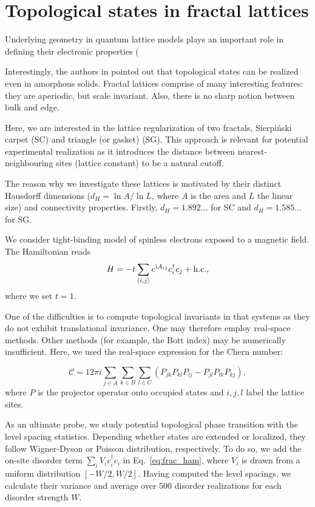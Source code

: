 \chapter{Topological states in fractal lattices}
\label{ch:fractals}

Underlying geometry in quantum lattice models plays an important role in defining their electronic properties (

Interestingly, the authors in pointed out that topological states can be realized even in amorphous solids. Fractal lattices comprise of many interesting features: they are aperiodic, but scale invariant. Also, there is no sharp notion between bulk and edge.

Here, we are interested in the lattice regularization of two fractals, Sierpiński carpet (SC) and triangle (or gasket) (SG). This approach is relevant for potential experimental realization as it introduces the distance between nearest-neighbouring sites (lattice constant) to be a natural cutoff.

The reason why we investigate these lattices is motivated by their distinct Hausdorff dimensions ($d_H = \ln A / \ln L$, where $A$ is the area and $L$ the linear size) and connectivity properties. Firstly, $d_H = 1.892 \ldots$ for SC and $d_H = 1.585 \ldots$ for SG. 



We consider tight-binding model of spinless electrons exposed to a magnetic field. The Hamiltonian reads
\begin{equation}
H = -t  \sum_{\langle i, j \rangle} e^{\textnormal{i} A_{ij}} c^{\dagger}_i c_j + \mathrm{h.c.},
\label{eq:frac_ham}
\end{equation}
where we set $t = 1$.

One of the difficulties is to compute topological invariants in that systems as they do not exhibit translational invariance. One may therefore employ real-space methods. Other methods (for example, the Bott index) may be numerically insufficient. Here, we used the real-space expression for the Chern number:

\begin{equation}
\mathcal{C} = 12 \pi i \sum_{j \in A} \sum_{k \in B} \sum_{l \in C} \left( P_{jk} P_{kl} P_{lj} - P_{jl} P_{lk} P_{kj} \right),
\label{eq: chern_real}
\end{equation}
where $P$ is the projector operator onto occupied states and $i, j, l$ label the lattice sites.



As an ultimate probe, we study potential topological phase transition with the level spacing statistics. Depending whether states are extended or localized, they follow Wigner-Dyson or Poisson distribution, respectively. To do so, we add the on-site disorder term $\sum_i V_i c_i^{\dagger} c_i$ in Eq.~\eqref{eq:frac_ham}, where $V_i$ is drawn from a uniform distribution $[-W/2, W/2 ]$. Having computed the level spacings, we calculate their variance and average over $500$ disorder realizations for each disorder strength $W$.


